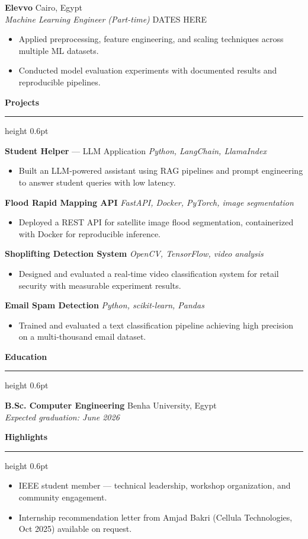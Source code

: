 \documentclass[10pt,a4paper]{article}
\newcommand{\cvsection}[1]{%
  \vspace{2pt}%
  {\large\bfseries #1}\\[-4pt]%
  \hrule height 0.6pt%
  \vspace{2pt}%
}
\begin{document}
\vspace{4pt}

\textbf{Elevvo} \hfill Cairo, Egypt\\
\textit{Machine Learning Engineer (Part-time)} \hfill DATES HERE
\begin{itemize}
  \item Applied preprocessing, feature engineering, and scaling techniques across multiple ML datasets.
  \item Conducted model evaluation experiments with documented results and reproducible pipelines.
\end{itemize}

\cvsection{Projects}

\textbf{Student Helper} --- LLM Application \hfill \textit{Python, LangChain, LlamaIndex}
\begin{itemize}
  \item Built an LLM-powered assistant using RAG pipelines and prompt engineering to answer student queries with low latency.
\end{itemize}

\textbf{Flood Rapid Mapping API} \hfill \textit{FastAPI, Docker, PyTorch, image segmentation}
\begin{itemize}
  \item Deployed a REST API for satellite image flood segmentation, containerized with Docker for reproducible inference.
\end{itemize}

\textbf{Shoplifting Detection System} \hfill \textit{OpenCV, TensorFlow, video analysis}
\begin{itemize}
  \item Designed and evaluated a real-time video classification system for retail security with measurable experiment results.
\end{itemize}

\textbf{Email Spam Detection} \hfill \textit{Python, scikit-learn, Pandas}
\begin{itemize}
  \item Trained and evaluated a text classification pipeline achieving high precision on a multi-thousand email dataset.
\end{itemize}

\cvsection{Education}

\textbf{B.Sc. Computer Engineering} \hfill Benha University, Egypt\\
\textit{Expected graduation: June 2026}

\cvsection{Highlights}

\begin{itemize}
  \item IEEE student member --- technical leadership, workshop organization, and community engagement.
  \item Internship recommendation letter from Amjad Bakri (Cellula Technologies, Oct 2025) available on request.
\end{itemize}
\end{document}

